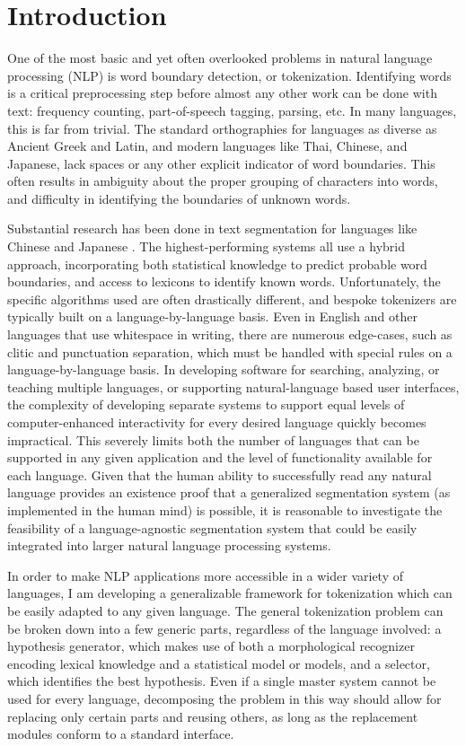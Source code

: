 \chapter{Introduction}

One of the most basic and yet often overlooked problems in natural language processing (NLP) is word boundary detection, or tokenization. Identifying words is a critical preprocessing step before almost any other work can be done with text: frequency counting, part-of-speech tagging, parsing, etc.
In many languages, this is far from trivial. The standard orthographies for languages as diverse as Ancient Greek and Latin, and modern languages like Thai, Chinese, and Japanese, lack spaces or any other explicit indicator of word boundaries. This often results in ambiguity about the proper grouping of characters into words, and difficulty in identifying the boundaries of unknown words.

Substantial research has been done in text segmentation for languages like Chinese \cite{peng04} and Japanese \cite{suzuki00}. The highest-performing systems all use a hybrid approach, incorporating both statistical knowledge to predict probable word boundaries, and access to lexicons to identify known words. Unfortunately, the specific algorithms used are often drastically different, and bespoke tokenizers are typically built on a language-by-language basis. Even in English and other languages that use whitespace in writing, there are numerous edge-cases, such as clitic and punctuation separation, which must be handled with special rules on a language-by-language basis. In developing software for searching, analyzing, or teaching multiple languages, or supporting natural-language based user interfaces, the complexity of developing separate systems to support equal levels of computer-enhanced interactivity for every desired language quickly becomes impractical. This severely limits both the number of languages that can be supported in any given application and the level of functionality available for each language. Given that the human ability to successfully read any natural language provides an existence proof that a generalized segmentation system (as implemented in the human mind) is possible, it is reasonable to investigate the feasibility of a language-agnostic segmentation system that could be easily integrated into larger natural language processing systems.

In order to make NLP applications more accessible in a wider variety of languages, I am developing a generalizable framework for tokenization which can be easily adapted to any given language. The general tokenization problem can be broken down into a few generic parts, regardless of the language involved: a hypothesis generator, which makes use of both a morphological recognizer encoding lexical knowledge and a statistical model or models, and a selector, which identifies the best hypothesis. Even if a single master system cannot be used for every language, decomposing the problem in this way should allow for replacing only certain parts and reusing others, as long as the replacement modules conform to a standard interface.

